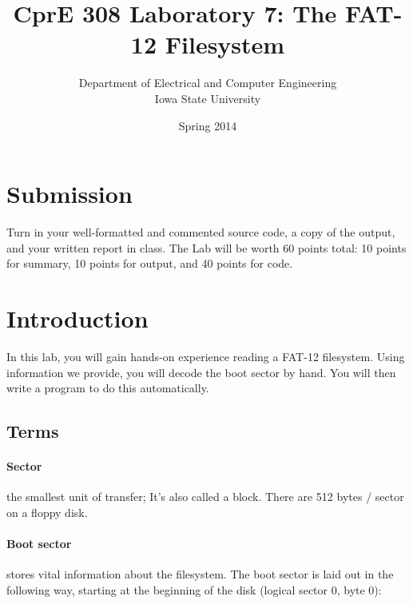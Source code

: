 \documentclass[letterpaper,10pt]{article}
\title{CprE 308 Laboratory 7: The FAT-12 Filesystem}
\author{Department of Electrical and Computer Engineering \\ Iowa State University}
\date{Spring 2014}
\newcommand{\cmd}[1]{\texttt{#1}}
\begin{document}
\maketitle

\section{Submission}
Turn in your well-formatted and commented source code, a copy of the output, and your written report in class.  The Lab will be worth 60 points total: 10 points for summary, 10 points for output, and 40 points for code.

\section{Introduction}
In this lab, you will gain hands-on experience reading a FAT-12 filesystem. Using
information we provide, you will decode the boot sector by hand. You will then write a
program to do this automatically.

\subsection{Terms}
\paragraph{Sector} the smallest unit of transfer; It's also called a block. There are 512 bytes / sector on a floppy disk.
\paragraph{Boot sector} stores vital information about the filesystem. The boot sector is laid out in
the following way, starting at the beginning of the disk (logical sector 0, byte 0):
\end{document}
